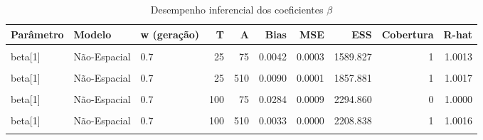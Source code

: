 \documentclass[
]{article}
\begin{document}
\begin{longtable}[t]{lllrrrrrrr}
\caption{\label{tab:tab-beta}Desempenho inferencial dos coeficientes $\beta$}\\
\toprule
Parâmetro & Modelo & w (geração) & T & A & Bias & MSE & ESS & Cobertura & R-hat\\
\midrule
\cellcolor{gray!10}{beta[1]} & \cellcolor{gray!10}{Espacial} & \cellcolor{gray!10}{0.7} & \cellcolor{gray!10}{25} & \cellcolor{gray!10}{75} & \cellcolor{gray!10}{0.0065} & \cellcolor{gray!10}{0.0003} & \cellcolor{gray!10}{1538.116} & \cellcolor{gray!10}{1} & \cellcolor{gray!10}{1.0024}\\
\cmidrule{1-10}\pagebreak[0]
beta[1] & Não-Espacial & 0.7 & 25 & 75 & 0.0042 & 0.0003 & 1589.827 & 1 & 1.0013\\
\cmidrule{1-10}\pagebreak[0]
\cellcolor{gray!10}{beta[1]} & \cellcolor{gray!10}{Espacial} & \cellcolor{gray!10}{0.7} & \cellcolor{gray!10}{25} & \cellcolor{gray!10}{510} & \cellcolor{gray!10}{0.0099} & \cellcolor{gray!10}{0.0001} & \cellcolor{gray!10}{1854.133} & \cellcolor{gray!10}{1} & \cellcolor{gray!10}{1.0007}\\
\cmidrule{1-10}\pagebreak[0]
beta[1] & Não-Espacial & 0.7 & 25 & 510 & 0.0090 & 0.0001 & 1857.881 & 1 & 1.0017\\
\cmidrule{1-10}\pagebreak[0]
\cellcolor{gray!10}{beta[1]} & \cellcolor{gray!10}{Espacial} & \cellcolor{gray!10}{0.7} & \cellcolor{gray!10}{100} & \cellcolor{gray!10}{75} & \cellcolor{gray!10}{0.0287} & \cellcolor{gray!10}{0.0009} & \cellcolor{gray!10}{2167.855} & \cellcolor{gray!10}{0} & \cellcolor{gray!10}{1.0037}\\
\cmidrule{1-10}\pagebreak[0]
beta[1] & Não-Espacial & 0.7 & 100 & 75 & 0.0284 & 0.0009 & 2294.860 & 0 & 1.0000\\
\cmidrule{1-10}\pagebreak[0]
\cellcolor{gray!10}{beta[1]} & \cellcolor{gray!10}{Espacial} & \cellcolor{gray!10}{0.7} & \cellcolor{gray!10}{100} & \cellcolor{gray!10}{510} & \cellcolor{gray!10}{0.0036} & \cellcolor{gray!10}{0.0000} & \cellcolor{gray!10}{1974.052} & \cellcolor{gray!10}{1} & \cellcolor{gray!10}{1.0006}\\
\cmidrule{1-10}\pagebreak[0]
beta[1] & Não-Espacial & 0.7 & 100 & 510 & 0.0033 & 0.0000 & 2208.838 & 1 & 1.0016\\
\cmidrule{1-10}\pagebreak[0]
\cellcolor{gray!10}{beta[1]} & \cellcolor{gray!10}{Espacial} & \cellcolor{gray!10}{Uniforme} & \cellcolor{gray!10}{25} & \cellcolor{gray!10}{75} & \cellcolor{gray!10}{0.0036} & \cellcolor{gray!10}{0.0003} & \cellcolor{gray!10}{1992.141} & \cellcolor{gray!10}{1} & \cellcolor{gray!10}{1.0001}\\

\end{longtable}
\end{document}
